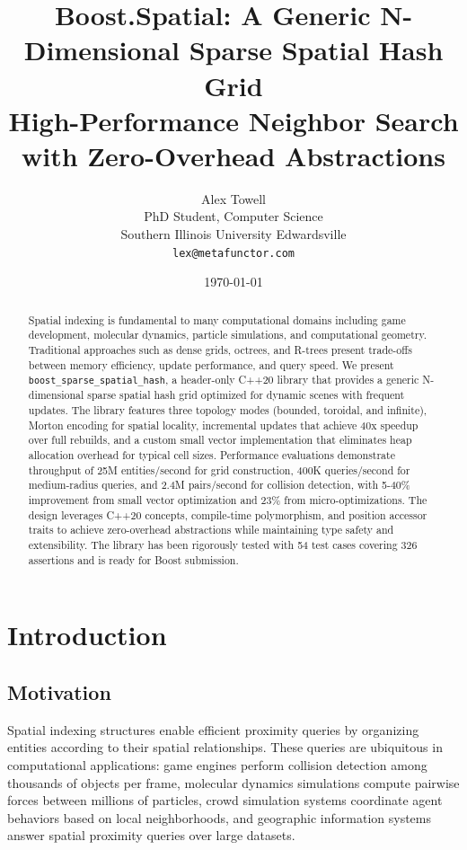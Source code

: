 \documentclass[11pt]{article}
\title{Boost.Spatial: A Generic N-Dimensional Sparse Spatial Hash Grid\\
\large High-Performance Neighbor Search with Zero-Overhead Abstractions}
\author{
Alex Towell\\
PhD Student, Computer Science\\
Southern Illinois University Edwardsville\\
\texttt{lex@metafunctor.com}
}
\date{\today}
\begin{document}
\maketitle

\begin{abstract}
Spatial indexing is fundamental to many computational domains including game development, molecular dynamics, particle simulations, and computational geometry. Traditional approaches such as dense grids, octrees, and R-trees present trade-offs between memory efficiency, update performance, and query speed. We present \texttt{boost\_sparse\_spatial\_hash}, a header-only C++20 library that provides a generic N-dimensional sparse spatial hash grid optimized for dynamic scenes with frequent updates. The library features three topology modes (bounded, toroidal, and infinite), Morton encoding for spatial locality, incremental updates that achieve 40x speedup over full rebuilds, and a custom small vector implementation that eliminates heap allocation overhead for typical cell sizes. Performance evaluations demonstrate throughput of 25M entities/second for grid construction, 400K queries/second for medium-radius queries, and 2.4M pairs/second for collision detection, with 5-40\% improvement from small vector optimization and 23\% from micro-optimizations. The design leverages C++20 concepts, compile-time polymorphism, and position accessor traits to achieve zero-overhead abstractions while maintaining type safety and extensibility. The library has been rigorously tested with 54 test cases covering 326 assertions and is ready for Boost submission.
\end{abstract}

\section{Introduction}

\subsection{Motivation}

Spatial indexing structures enable efficient proximity queries by organizing entities according to their spatial relationships. These queries are ubiquitous in computational applications: game engines perform collision detection among thousands of objects per frame, molecular dynamics simulations compute pairwise forces between millions of particles, crowd simulation systems coordinate agent behaviors based on local neighborhoods, and geographic information systems answer spatial proximity queries over large datasets.
\end{document}
